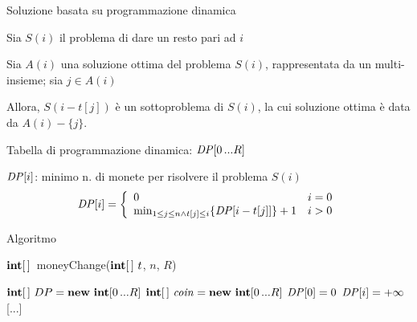 \begin{frame}{Soluzione basata su programmazione dinamica}

\vspace{-9pt}
\begin{myboxtitle}
\BI
\item Sia $S(i)$ il problema di dare un resto pari ad $i$
\item Sia $A(i)$ una soluzione ottima del problema $S(i)$, rappresentata da un 
multi-insieme; sia $j \in A(i)$
\item Allora, $S(i-t[j])$ è un sottoproblema di
$S(i)$, la cui soluzione ottima è data da $A(i)-\{ j \}$.
\EI
\end{myboxtitle}

\begin{myboxtitle}
\BI
\item Tabella di programmazione dinamica: $\DP[0 \mydots R]$
\item $\DP[i]$: \alert{minimo n. di monete per risolvere il problema $S(i)$}
\EI
\[
\DP[i] = \left\{ 
\begin{array}{ll}
  0 & i=0 \\
  \min_{1 \leq j \leq n \wedge t[j] \leq i} \{ \DP[i-t[j]] \} + 1 & i>0
  \end{array} 
\right.
\]
\end{myboxtitle}


\end{frame}

\begin{frame}{Algoritmo}

\vspace{-12pt}
\begin{Procedure}
\caption[A]{$\INTARRAY$\ \textsf{moneyChange}($\INTARRAY\ t$, \INTEGER $n$, \INTEGER $R$)}
$\INTEGER[\,]\ DP = \NEW\ \INTEGER[0 \mydots R]$
$\INTEGER[\,]\ \mathit{coin} = \NEW\ \INTEGER[0 \mydots R]$
$\DP[0] = 0$\;
 {
  $\DP[i] = +\infty$\;
   {
  }
}
[...]
\end{Procedure}

\end{frame}


